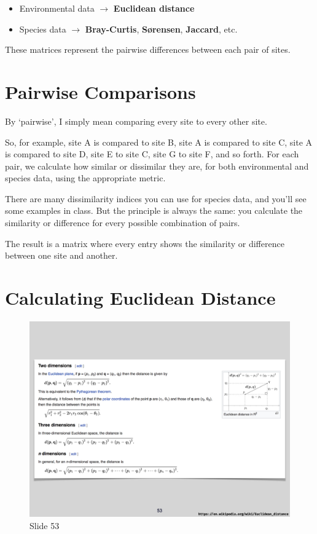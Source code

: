 \documentclass[
  11pt,
]{book}
\providecommand{\tightlist}{%
  \setlength{\itemsep}{0pt}\setlength{\parskip}{0pt}}
\begin{document}
\begin{itemize}
\tightlist
\item
  Environmental data \(\rightarrow\) \textbf{Euclidean distance}
\item
  Species data \(\rightarrow\) \textbf{Bray-Curtis}, \textbf{Sørensen},
  \textbf{Jaccard}, etc.
\end{itemize}

These matrices represent the pairwise differences between each pair of
sites.

\section{Pairwise Comparisons}\label{pairwise-comparisons}

By `pairwise', I simply mean comparing every site to every other site.

So, for example, site A is compared to site B, site A is compared to
site C, site A is compared to site D, site E to site C, site G to site
F, and so forth. For each pair, we calculate how similar or dissimilar
they are, for both environmental and species data, using the appropriate
metric.

There are many dissimilarity indices you can use for species data, and
you'll see some examples in class. But the principle is always the same:
you calculate the similarity or difference for every possible
combination of pairs.

The result is a matrix where every entry shows the similarity or
difference between one site and another.

\section{Calculating Euclidean
Distance}\label{calculating-euclidean-distance}

\begin{figure}[ht]
\centering
\includegraphics[width=0.8\linewidth]{../images/BDC334/BDC334-053.jpeg}
\caption*{Slide 53}
\end{figure}
\end{document}
